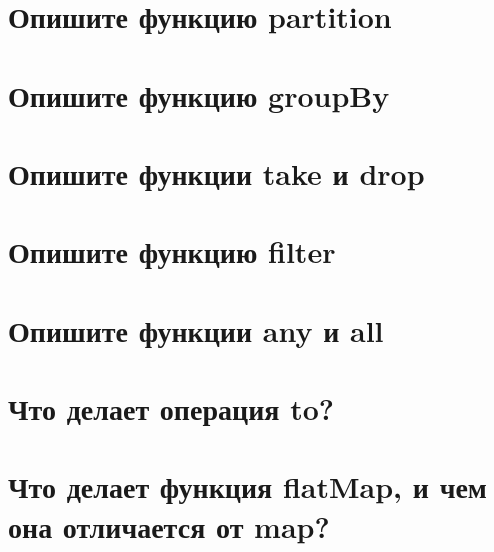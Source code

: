 \documentclass[12pt]{article}
\begin{document}
\section*{Опишите функцию partition}
\begin{enumerate}[leftmargin=*]
\end{enumerate}
\vspace{2mm}
\section*{Опишите функцию groupBy}
\begin{enumerate}[leftmargin=*]
\end{enumerate}
\vspace{2mm}
\section*{Опишите функции take и drop}
\begin{enumerate}[leftmargin=*]
\end{enumerate}
\vspace{2mm}
\section*{Опишите функцию filter}
\begin{enumerate}[leftmargin=*]
\end{enumerate}
\vspace{2mm}
\section*{Опишите функции any и all}
\begin{enumerate}[leftmargin=*]
\end{enumerate}
\vspace{2mm}
\section*{Что делает операция to?}
\begin{enumerate}[leftmargin=*]
\end{enumerate}
\vspace{2mm}
\section*{Что делает функция flatMap, и чем она отличается от map?}
\begin{enumerate}[leftmargin=*]
\end{enumerate}
\vspace{2mm}
\end{document}
